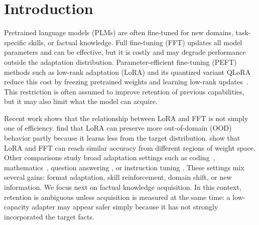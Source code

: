 \documentclass[11pt]{article}
\begin{document}
\section{Introduction}
\label{sec:introduction}

Pretrained language models (PLMs) are often fine-tuned for new
domains, task-specific skills, or factual knowledge. Full fine-tuning (FFT)
updates all model parameters and can be effective, but it is costly and may
degrade performance outside the adaptation distribution. Parameter-efficient fine-tuning (PEFT)
methods such as low-rank adaptation (LoRA) and its quantized variant QLoRA
reduce this cost by freezing pretrained
weights and learning low-rank updates~\citep{hu2022lora,dettmers2023qlora}.
This restriction is often assumed to improve retention of previous capabilities, but it may also limit
what the model can acquire.

Recent work shows that the relationship between LoRA and FFT is not simply one
of efficiency. \citet{biderman2024lora} find that LoRA can preserve more
out-of-domain (OOD) behavior partly because it learns less from the target
distribution. \citet{shuttleworth2024lora} show that LoRA and FFT can reach
similar accuracy from different regions of weight space.
Other comparisons study broad
adaptation settings such as coding~\citep{mannisto-etal-2025-comparative},
mathematics~\citep{biderman2024lora}, question answering
\citep{sun2023comparativestudyfullparameterlorabased}, or instruction tuning
\citep{xin-etal-2024-beyond}. These settings mix several gains:
format adaptation, skill reinforcement, domain shift, or new information. 
We focus next on factual knowledge acquisition.
In this context, retention is ambiguous unless
acquisition is measured at the same time: a low-capacity adapter may appear
safer simply because it has not strongly incorporated the target facts.

\end{document}
